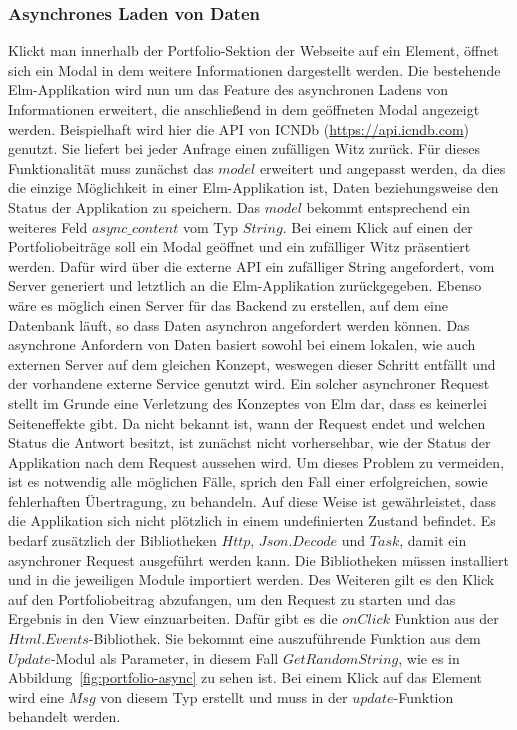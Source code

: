 \subsubsection{Asynchrones Laden von Daten}
\label{sec:async-laden}
Klickt man innerhalb der Portfolio-Sektion der Webseite auf ein Element, öffnet sich ein Modal in dem weitere Informationen dargestellt werden. Die bestehende Elm-Applikation wird nun um das Feature des asynchronen Ladens von Informationen erweitert, die anschließend in dem geöffneten Modal angezeigt werden. Beispielhaft wird hier die \ac{API} von \ac{ICNDb} (\url{https://api.icndb.com}) genutzt. Sie liefert bei jeder Anfrage einen zufälligen Witz zurück.
Für dieses Funktionalität muss zunächst das $model$ erweitert und angepasst werden, da dies die einzige Möglichkeit in einer Elm-Applikation ist, Daten beziehungsweise den Status der Applikation zu speichern. Das $model$ bekommt entsprechend ein weiteres Feld $async\_content$ vom Typ $String$.
Bei einem Klick auf einen der Portfoliobeiträge soll ein Modal geöffnet und ein zufälliger Witz präsentiert werden. Dafür wird über die externe \ac{API} ein zufälliger String angefordert, vom Server generiert und letztlich an die Elm-Applikation zurückgegeben. Ebenso wäre es möglich einen Server für das Backend zu erstellen, auf dem eine Datenbank läuft, so dass Daten asynchron angefordert werden können. Das asynchrone Anfordern von Daten basiert sowohl bei einem lokalen, wie auch externen Server auf dem gleichen Konzept, weswegen dieser Schritt entfällt und der vorhandene externe Service genutzt wird.
Ein solcher asynchroner Request stellt im Grunde eine Verletzung des Konzeptes von Elm dar, dass es keinerlei Seiteneffekte gibt. Da nicht bekannt ist, wann der Request endet und welchen Status die Antwort besitzt, ist zunächst nicht vorhersehbar, wie der Status der Applikation nach dem Request aussehen wird. Um dieses Problem zu vermeiden, ist es notwendig alle möglichen Fälle, sprich den Fall einer erfolgreichen, sowie fehlerhaften Übertragung, zu behandeln. Auf diese Weise ist gewährleistet, dass die Applikation sich nicht plötzlich in einem undefinierten Zustand befindet. Es bedarf zusätzlich der Bibliotheken $Http$, $Json.Decode$ und $Task$, damit ein asynchroner Request ausgeführt werden kann. Die Bibliotheken müssen installiert und in die jeweiligen Module importiert werden. Des Weiteren gilt es den Klick auf den Portfoliobeitrag abzufangen, um den Request zu starten und das Ergebnis in den View einzuarbeiten. Dafür gibt es die $onClick$ Funktion aus der $Html.Events$-Bibliothek. Sie bekommt eine auszuführende Funktion aus dem $Update$-Modul als Parameter, in diesem Fall $GetRandomString$, wie es in Abbildung~\ref{fig:portfolio-async} zu sehen ist. Bei einem Klick auf das Element wird eine $Msg$ von diesem Typ erstellt und muss in der $update$-Funktion behandelt werden.
